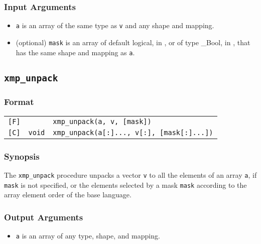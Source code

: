 \subsubsection*{Input Arguments}
\begin{itemize}
 \item {\tt a} is an array of the same type as {\tt v} and any shape
       and mapping.
 \item (optional) {\tt mask} is an array of default logical, in {\XMPF},
	   or of type \_Bool, in {\XMPC}, that has the same shape and
	   mapping as {\tt a}.
	   
\end{itemize}


\subsection{\tt xmp\_unpack}
\label{155321_16Jan17}

\subsubsection*{Format}

\begin{tabular}{lll}

\verb![F]!&            & {\tt xmp\_unpack(a, v, [mask])}\\

\verb![C]!& {\tt void} & {\tt xmp\_unpack(a[:]..., v[:], [mask[:]...])}\\

\end{tabular}

\subsubsection*{Synopsis}

The {\tt xmp\_unpack} procedure unpacks a vector {\tt v} to all the
elements of an array {\tt a}, if {\tt mask} is not specified, or the
elements selected by a mask {\tt mask} according
to the array element order of the base language.

\subsubsection*{Output Arguments}
\begin{itemize}
 \item {\tt a} is an array of any type, shape, and mapping.
\end{itemize}

